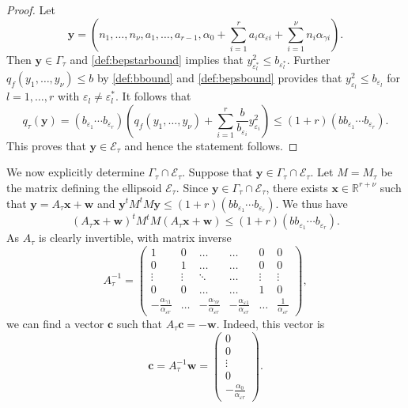 \documentclass[11pt]{report}
\theoremstyle{definition}
\newcommand{\eps}{\varepsilon}
\begin{document}
\begin{proof}
Let
\[\mathbf{y} = \left(n_1, \dots, n_{\nu}, a_1, \dots, a_{r-1}, \alpha_0+\sum_{i = 1}^r a_i \alpha_{\varepsilon i} + \sum_{i = 1}^{\nu} n_i \alpha_{\gamma i}\right).\]
Then $\mathbf{y} \in \Gamma_\tau$ and \eqref{def:bepstarbound} implies that $y_{\eps_l^*}^2\leq b_{\eps_l^*}$. Further $q_f(y_1, \dots, y_{\nu})\leq b$ by \eqref{def:bbound} and \eqref{def:bepsbound} provides that $y_{\eps_l}^2\leq b_{\eps_l}$ for $l = 1, \dots, r$ with $\eps_l \neq \eps_l^*$. It follows that
\[q_\tau(\mathbf{y}) = (b_{\varepsilon_1}\cdots b_{\varepsilon_r})\left( q_f(y_1, \dots, y_{\nu}) + \sum_{i = 1}^r\frac{b}{b_{\varepsilon_i}}y_{\varepsilon_i}^2\right) \leq (1+r)(bb_{\varepsilon_1}\cdots b_{\varepsilon_r}).\]
This proves that $\mathbf{y}\in\mathcal E_\tau$ and hence the statement follows.
\end{proof}
%
We now explicitly determine $ \Gamma_\tau\cap \mathcal E_\tau$. Suppose that $\mathbf{y}\in \Gamma_\tau\cap \mathcal E_\tau$. Let $M=M_\tau$ be the matrix defining the ellipsoid $\mathcal{E}_{\tau}$.
Since $\mathbf{y}\in \Gamma_\tau\cap \mathcal E_\tau$, there exists $\mathbf{x}\in \mathbb{R}^{r + \nu}$ such that $\mathbf{y}= A_\tau \mathbf{x}+\mathbf{w}$ and ${\mathbf{y}^tM^tM\mathbf{y}\leq (1 + r)(bb_{\varepsilon_1}\cdots b_{\varepsilon_r})}$. We thus have
\[(A_\tau \mathbf{x}+\mathbf{w})^tM^tM(A_\tau \mathbf{x}+\mathbf{w}) \leq (1 + r)(bb_{\varepsilon_1}\cdots b_{\varepsilon_r}).\]
As $A_{\tau}$ is clearly invertible, with matrix inverse
\[A_{\tau}^{-1} = \begin{pmatrix}
	1 & 0 & \dots &  \dots & 0 & 0\\
	0 & 1	& \dots & \dots & 0 & 0\\
	\vdots & \vdots & \ddots & \dots & \vdots & \vdots \\
	0 & 0 & \dots &  \dots & 1 & 0\\
	-\frac{\alpha_{\gamma 1}}{\alpha_{\varepsilon {r}}} & \dots &-\frac{\alpha_{\gamma {\nu}}}{\alpha_{\varepsilon {r}}} & -\frac{\alpha_{\varepsilon 1}}{\alpha_{\varepsilon {r}}} & \dots & \frac{1}{\alpha_{\varepsilon {r}}}
\end{pmatrix},\]
we can find a vector $\mathbf{c}$ such that $A_{\tau}\mathbf{c} = -\mathbf{w}$. Indeed, this vector is
\[\mathbf{c} = A_{\tau}^{-1}\mathbf{w} =\begin{pmatrix}
	0 \\ 0 \\ \vdots \\ 0 \\ -\frac{\alpha_0}{\alpha_{\varepsilon r}}
\end{pmatrix}.\]
\end{document}
